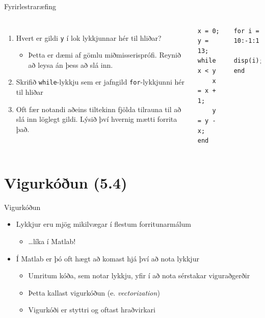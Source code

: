 \documentclass{beamer}
\begin{document}
\begin{frame}[fragile]{Fyrirlestraræfing}
\begin{columns}
\begin{enumerate}
 \item Hvert er gildi \texttt{y} í lok lykkjunnar hér til hliðar?
 \begin{itemize}
  \item Þetta er dæmi af gömlu miðmisserisprófi. Reynið að leysa án þess að slá inn.
 \end{itemize}
 \item Skrifið \texttt{while}-lykkju sem er jafngild \texttt{for}-lykkjunni hér til hliðar
 \item Oft fær notandi aðeins tiltekinn fjölda tilrauna til að slá inn löglegt gildi. Lýsið því hvernig mætti forrita það.
\end{enumerate}
\begin{verbatim}
x = 0; y = 13;
while x < y
    x = x + 1;
    y = y - x;
end
\end{verbatim}
\begin{verbatim}
for i = 10:-1:1
    disp(i);
end
\end{verbatim}
\end{columns}
\end{frame}

\section{Vigurkóðun (5.4)}

\begin{frame}{Vigurkóðun}
\begin{itemize}
 \item Lykkjur eru mjög mikilvægar í flestum forritunarmálum
 \begin{itemize}
  \item \ldots líka í Matlab!
 \end{itemize}
 \item Í Matlab er þó oft hægt að komast hjá því að nota lykkjur
 \begin{itemize}
  \item Umritum kóða, sem notar lykkju, yfir í að nota sérstakar viguraðgerðir
  \item Þetta kallast vigurkóðun (e. \emph{vectorization})
  \item Vigurkóði er styttri og oftast hraðvirkari
 \end{itemize}
\end{itemize}
\end{frame}
\end{document}
